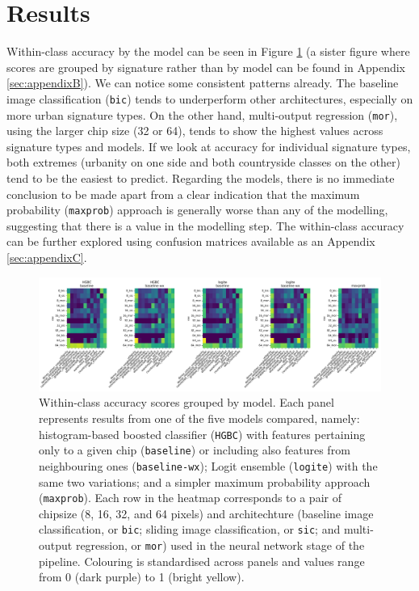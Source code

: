 \section{Results} %
\label{sec:results}



Within-class accuracy by the model can be seen in Figure \ref{fig:wc_accuracy_x_model} (a
sister figure where scores are grouped by signature rather than by model can be found in
Appendix \ref{sec:appendixB}). We can notice some consistent patterns already. The
baseline image classification (\texttt{bic}) tends to underperform other architectures,
especially on more urban signature types. On the other hand, multi-output regression (\texttt{mor}),
using the larger chip size (32 or 64), tends to show the highest values across signature
types and models. If we look at accuracy for individual signature types, both extremes
(urbanity on one side and both countryside classes on the other)
tend to be the easiest to predict. Regarding the models, there is no immediate conclusion to be
made apart from a clear indication that the maximum probability (\texttt{maxprob}) approach is generally
worse than any of the modelling, suggesting that there is a value in the modelling step.
The within-class accuracy can be further explored using confusion matrices available as an
Appendix \ref*{sec:appendixC}.


\begin{figure}
    \centering
    \includegraphics[width=1.0\linewidth]{fig/wc_accuracy_x_model.png}
    \caption{\footnotesize Within-class accuracy scores grouped by model. Each panel
    represents results from one of the five models compared, namely:
    histogram-based boosted classifier (\texttt{HGBC}) with features
    pertaining only to a given chip (\texttt{baseline}) or including also features
    from neighbouring ones (\texttt{baseline-wx}); Logit ensemble
    (\texttt{logite}) with the same two variations; and a simpler maximum
    probability approach (\texttt{maxprob}). Each row in the heatmap
    corresponds to a pair of chipsize (8, 16, 32, and 64 pixels)
    and architechture (baseline image classification, or \texttt{bic}; sliding
            image classification, or \texttt{sic}; and multi-output
    regression, or \texttt{mor}) used in the neural network stage of the
    pipeline. Colouring is standardised across panels and values range from
    0 (dark purple) to 1 (bright yellow).}
    \label{fig:wc_accuracy_x_model}
\end{figure}

